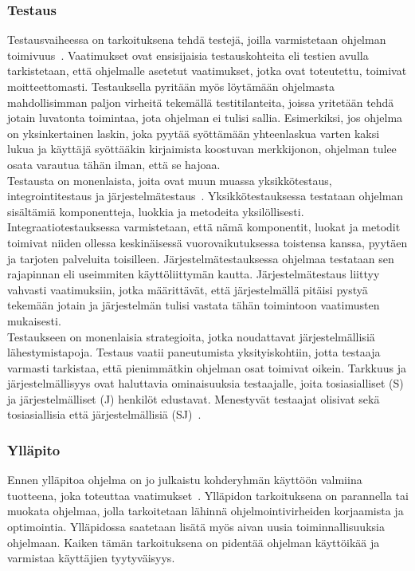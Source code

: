 \documentclass[finnish]{../tktltiki2}
\theoremstyle{definition}
\theoremstyle{remark}
\begin{document}
\subsubsection{Testaus}

Testausvaiheessa on tarkoituksena tehdä testejä, joilla varmistetaan ohjelman toimivuus~\cite{SWEBOK:409902}. Vaatimukset ovat ensisijaisia
testauskohteita eli testien avulla tarkistetaan, että ohjelmalle asetetut vaatimukset, jotka ovat toteutettu, toimivat
moitteettomasti. Testauksella pyritään myös löytämään ohjelmasta mahdollisimman paljon virheitä tekemällä testitilanteita, joissa yritetään
tehdä jotain luvatonta toimintaa, jota ohjelman ei tulisi sallia. Esimerkiksi, jos ohjelma on yksinkertainen laskin,
joka pyytää syöttämään yhteenlaskua varten kaksi lukua ja käyttäjä syöttääkin kirjaimista koostuvan merkkijonon, ohjelman
tulee osata varautua tähän ilman, että se hajoaa.\\

Testausta on monenlaista, joita ovat muun muassa yksikkötestaus,
integrointitestaus ja järjestelmätestaus~\cite{Capretz:2010:MSS:1726559.1726574}.
Yksikkötestauksessa testataan ohjelman sisältämiä komponentteja, luokkia
ja metodeita yksilöllisesti. Integraatiotestauksessa varmistetaan, että nämä komponentit, luokat ja metodit toimivat niiden ollessa keskinäisessä vuorovaikutuksessa toistensa kanssa, pyytäen ja tarjoten palveluita toisilleen. Järjestelmätestauksessa ohjelmaa testataan sen rajapinnan eli useimmiten käyttöliittymän kautta. Järjestelmätestaus liittyy vahvasti vaatimuksiin, jotka määrittävät, että järjestelmällä pitäisi pystyä tekemään jotain ja järjestelmän tulisi vastata tähän toimintoon vaatimusten mukaisesti.\\

Testaukseen on monenlaisia strategioita, jotka noudattavat järjestelmälli\-siä lähestymistapoja. Testaus vaatii paneutumista yksityiskohtiin, jotta testaaja varmasti tarkistaa, että pienimmätkin ohjelman osat toimivat oikein. Tarkkuus ja järjestelmällisyys ovat
haluttavia ominaisuuksia testaajalle, joita tosiasialliset (S) ja järjestelmälliset (J) henkilöt edustavat. Menestyvät testaajat olisivat sekä tosiasiallisia että järjestelmällisiä (SJ)~\cite{Capretz:2010:MSS:1726559.1726574}.

\subsubsection{Ylläpito}

Ennen ylläpitoa ohjelma on jo julkaistu kohderyhmän käyttöön valmiina tuotteena, joka toteuttaa vaatimukset~\cite{SWEBOK:409902}. Ylläpidon
tarkoituksena on parannella tai muokata ohjelmaa, jolla tarkoitetaan lähinnä ohjelmointivirheiden
korjaamista ja optimointia. Ylläpidossa saatetaan lisätä myös aivan uusia toiminnallisuuksia
ohjelmaan. Kaiken tämän tarkoituksena on pidentää ohjelman käyttöikää ja varmistaa käyttäjien
tyytyväisyys.\\
\end{document}
